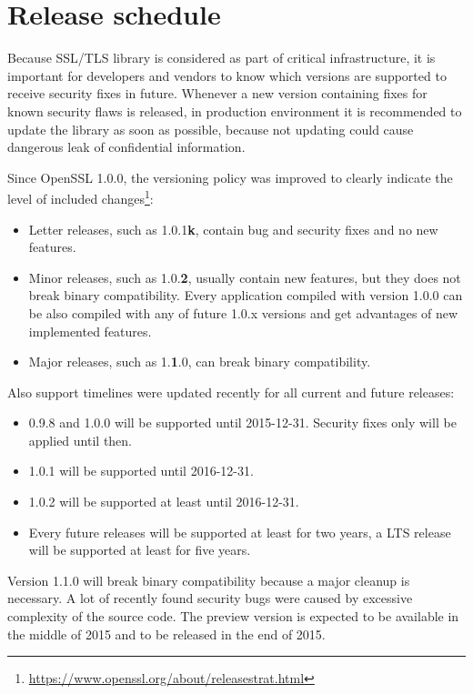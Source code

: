 \section{Release schedule}

Because SSL/TLS library is considered as part of critical infrastructure, it is important for developers and vendors to know which versions are supported to receive security fixes in future. Whenever a new version containing fixes for known security flaws is released, in production environment it is recommended to update the library as soon as possible, because not updating could cause dangerous leak of confidential information.

Since OpenSSL 1.0.0, the versioning policy was improved to clearly indicate the level of included changes\footnote{\url{https://www.openssl.org/about/releasestrat.html}}:

\begin{itemize}
  \item Letter releases, such as 1.0.1\textbf{k}, contain bug and security fixes and no new features.
  \item Minor releases, such as 1.0.\textbf{2}, usually contain new features, but they does not break binary compatibility. Every application compiled with version 1.0.0 can be also compiled with any of future 1.0.x versions and get advantages of new implemented features.
  \item Major releases, such as 1.\textbf{1}.0, can break binary compatibility.
\end{itemize}

Also support timelines were updated recently for all current and future releases:

\begin{itemize}
  \item 0.9.8 and 1.0.0 will be supported until 2015-12-31. Security fixes only will be applied until then.
  \item 1.0.1 will be supported until 2016-12-31.
  \item 1.0.2 will be supported at least until 2016-12-31.
  \item Every future releases will be supported at least for two years, a LTS release will be supported at least for five years.
\end{itemize}

Version 1.1.0 will break binary compatibility because a major cleanup is necessary. A lot of recently found security bugs were caused by excessive complexity of the source code. The preview version is expected to be available in the middle of 2015 and to be released in the end of 2015.

